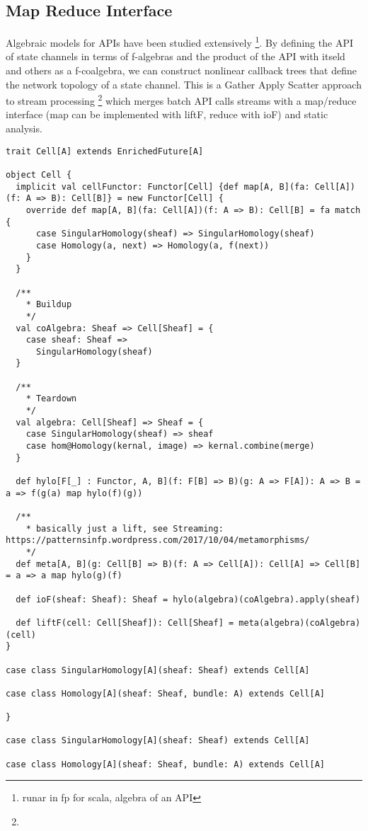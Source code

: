 \documentclass{article}
\begin{document}
\subsection{Map Reduce Interface} 
Algebraic models for APIs have been studied extensively \footnote{runar in fp for scala, algebra of an API}. By defining the API of state channels in terms of f-algebras and the product of the API with itseld and others as a f-coalgebra, we can construct nonlinear callback trees that define the network topology of a state channel. This is a Gather Apply Scatter approach to stream processing \footnote{} which merges batch API calls streams with a map/reduce interface (map can be implemented with liftF, reduce with ioF) and static analysis. 
\begin{lstlisting}[style=myScalastyle]
trait Cell[A] extends EnrichedFuture[A]

object Cell {
  implicit val cellFunctor: Functor[Cell] {def map[A, B](fa: Cell[A])(f: A => B): Cell[B]} = new Functor[Cell] {
    override def map[A, B](fa: Cell[A])(f: A => B): Cell[B] = fa match {
      case SingularHomology(sheaf) => SingularHomology(sheaf)
      case Homology(a, next) => Homology(a, f(next))
    }
  }

  /**
    * Buildup
    */
  val coAlgebra: Sheaf => Cell[Sheaf] = {
    case sheaf: Sheaf =>
      SingularHomology(sheaf)
  }

  /**
    * Teardown
    */
  val algebra: Cell[Sheaf] => Sheaf = {
    case SingularHomology(sheaf) => sheaf
    case hom@Homology(kernal, image) => kernal.combine(merge)
  }

  def hylo[F[_] : Functor, A, B](f: F[B] => B)(g: A => F[A]): A => B = a => f(g(a) map hylo(f)(g))

  /**
    * basically just a lift, see Streaming: https://patternsinfp.wordpress.com/2017/10/04/metamorphisms/
    */
  def meta[A, B](g: Cell[B] => B)(f: A => Cell[A]): Cell[A] => Cell[B] = a => a map hylo(g)(f)

  def ioF(sheaf: Sheaf): Sheaf = hylo(algebra)(coAlgebra).apply(sheaf)

  def liftF(cell: Cell[Sheaf]): Cell[Sheaf] = meta(algebra)(coAlgebra)(cell)
}

case class SingularHomology[A](sheaf: Sheaf) extends Cell[A]

case class Homology[A](sheaf: Sheaf, bundle: A) extends Cell[A]

}

case class SingularHomology[A](sheaf: Sheaf) extends Cell[A]

case class Homology[A](sheaf: Sheaf, bundle: A) extends Cell[A]
\end{lstlisting}
\end{document}
